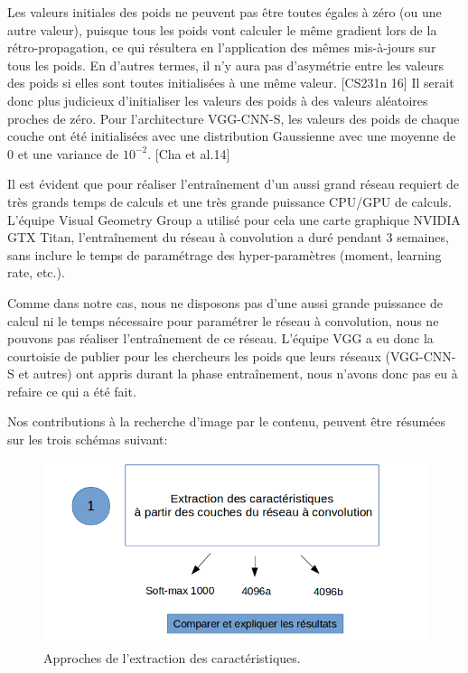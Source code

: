	Les valeurs initiales des poids ne peuvent pas être toutes égales à zéro (ou une autre valeur), puisque tous les poids vont calculer le même gradient lors de la rétro-propagation, ce qui résultera en l'application des mêmes mis-à-jours sur tous les poids. En d'autres termes, il n'y aura pas d’asymétrie entre les valeurs des poids si elles sont toutes initialisées à une même valeur. [CS231n 16]	
	Il serait donc plus judicieux d'initialiser les valeurs des poids à des valeurs aléatoires proches de zéro. Pour l'architecture VGG-CNN-S, les valeurs des poids de chaque couche ont été initialisées avec une distribution Gaussienne avec une moyenne de 0 et une variance de $10^{-2}$. [Cha et al.14]
	
	Il est évident que pour réaliser l’entraînement d'un aussi grand réseau requiert de très grands temps de calculs et une très grande puissance CPU/GPU de calculs. L'équipe Visual Geometry Group a utilisé pour cela une carte graphique NVIDIA GTX Titan, l'entraînement du réseau à convolution a duré pendant 3 semaines, sans inclure le temps de paramétrage des hyper-paramètres (moment, learning rate, etc.).
	
	Comme dans notre cas, nous ne disposons pas d'une aussi grande puissance de calcul ni le temps nécessaire pour paramétrer le réseau à convolution, nous ne pouvons pas réaliser l’entraînement de ce réseau. L'équipe VGG a eu donc la courtoisie de publier pour les chercheurs les poids que leurs réseaux (VGG-CNN-S et autres) ont appris durant la phase entraînement, nous n'avons donc pas eu à refaire ce qui a été fait.
	
	Nos contributions à la recherche d'image par le contenu, peuvent être résumées sur les trois schémas suivant:
	
	\begin{figure}[H]
	\centering
		\includegraphics[width=5in]{Figures/diagramme1.png}
	\caption[An Electron]{Approches de l'extraction des caractéristiques.}
	\label{fig:Electron}
\end{figure} 

